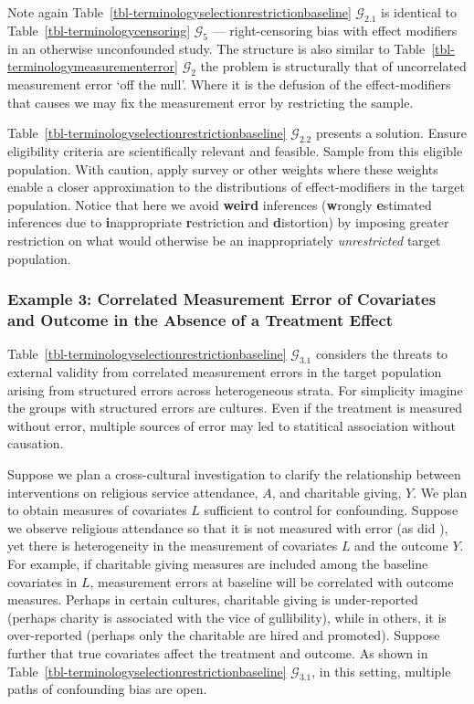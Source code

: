 \documentclass[
  single column]{article}
\begin{document}
Note again Table~\ref{tbl-terminologyselectionrestrictionbaseline}
\(\mathcal{G}_{2.1}\) is identical to
Table~\ref{tbl-terminologycensoring} \(\mathcal{G}_5\) ---
right-censoring bias with effect modifiers in an otherwise unconfounded
study. The structure is also similar to
Table~\ref{tbl-terminologymeasurementerror} \(\mathcal{G}_2\) the
problem is structurally that of uncorrelated measurement error `off the
null'. Where it is the defusion of the effect-modifiers that causes we
may fix the measurement error by restricting the sample.

Table~\ref{tbl-terminologyselectionrestrictionbaseline}
\(\mathcal{G}_{2.2}\) presents a solution. Ensure eligibility criteria
are scientifically relevant and feasible. Sample from this eligible
population. With caution, apply survey or other weights where these
weights enable a closer approximation to the distributions of
effect-modifiers in the target population. Notice that here we avoid
\textbf{weird} inferences (\textbf{w}rongly \textbf{e}stimated
inferences due to \textbf{i}nappropriate \textbf{r}estriction and
\textbf{d}istortion) by imposing greater restriction on what would
otherwise be an inappropriately \emph{unrestricted} target population.

\subsubsection{Example 3: Correlated Measurement Error of Covariates and
Outcome in the Absence of a Treatment
Effect}\label{example-3-correlated-measurement-error-of-covariates-and-outcome-in-the-absence-of-a-treatment-effect}

Table~\ref{tbl-terminologyselectionrestrictionbaseline}
\(\mathcal{G}_{3.1}\) considers the threats to external validity from
correlated measurement errors in the target population arising from
structured errors across heterogeneous strata. For simplicity imagine
the groups with structured errors are cultures. Even if the treatment is
measured without error, multiple sources of error may led to statitical
association without causation.

Suppose we plan a cross-cultural investigation to clarify the
relationship between interventions on religious service attendance,
\(A\), and charitable giving, \(Y\). We plan to obtain measures of
covariates \(L\) sufficient to control for confounding. Suppose we
observe religious attendance so that it is not measured with error (as
did ), yet there
is heterogeneity in the measurement of covariates \(L\) and the outcome
\(Y\). For example, if charitable giving measures are included among the
baseline covariates in \(L\), measurement errors at baseline will be
correlated with outcome measures. Perhaps in certain cultures,
charitable giving is under-reported (perhaps charity is associated with
the vice of gullibility), while in others, it is over-reported (perhaps
only the charitable are hired and promoted). Suppose further that true
covariates affect the treatment and outcome. As shown in
Table~\ref{tbl-terminologyselectionrestrictionbaseline}
\(\mathcal{G}_{3.1}\), in this setting, multiple paths of confounding
bias are open.
\end{document}
